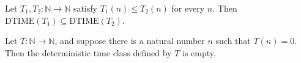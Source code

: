 \begin{theorem}
\label{Complexity.DTIME.mono}
\leanok
{}
Let $T_1,T_2 : \mathbb{N} \to \mathbb{N}$ satisfy $T_1(n) \le T_2(n)$ for every $n$.
Then $\mathrm{DTIME}(T_1) \subseteq \mathrm{DTIME}(T_2)$.
\end{theorem}

\begin{theorem}
\label{Complexity.DTIME_eq_empty_of_exists_zero}
\leanok
{}
Let $T : \mathbb{N} \to \mathbb{N}$, and suppose there is a natural number $n$ such that
$T(n)=0$. Then the deterministic time class defined by $T$ is empty.
\end{theorem}
